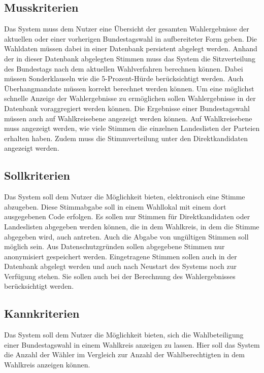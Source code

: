 \documentclass[a4paper]{scrreprt}
\begin{document}
\subsection{Musskriterien}

Das System muss dem Nutzer eine Übersicht der gesamten Wahlergebnisse der aktuellen oder einer vorherigen Bundestagswahl in aufbereiteter Form geben. Die Wahldaten müssen dabei in einer Datenbank persistent abgelegt werden. Anhand der in dieser Datenbank abgelegten Stimmen muss das System die Sitzverteilung des Bundestags nach dem aktuellen Wahlverfahren berechnen können. Dabei müssen Sonderklauseln wie die 5-Prozent-Hürde berücksichtigt werden. Auch Überhangmandate müssen korrekt berechnet werden können. Um eine möglichst schnelle Anzeige der Wahlergebnisse zu ermöglichen sollen Wahlergebnisse in der Datenbank voraggregiert werden können. Die Ergebnisse einer Bundestagswahl müssen auch auf Wahlkreisebene angezeigt werden können. Auf Wahlkreisebene muss angezeigt werden, wie viele Stimmen die einzelnen Landeslisten der Parteien erhalten haben. Zudem muss die Stimmverteilung unter den Direktkandidaten angezeigt werden. 

\subsection{Sollkriterien}

Das System soll dem Nutzer die Möglichkeit bieten, elektronisch eine Stimme abzugeben. Diese Stimmabgabe soll in einem Wahllokal mit einem dort ausgegebenen Code erfolgen. Es sollen nur Stimmen für Direktkandidaten oder Landeslisten abgegeben werden können, die in dem Wahlkreis, in dem die Stimme abgegeben wird, auch antreten. Auch die Abgabe von ungültigen Stimmen soll möglich sein. Aus Datenschutzgründen sollen abgegebene Stimmen nur anonymisiert gespeichert werden. Eingetragene Stimmen sollen auch in der Datenbank abgelegt werden und auch nach Neustart des Systems noch zur Verfügung stehen. Sie sollen auch bei der Berechnung des Wahlergebnisses berücksichtigt werden. 

\subsection{Kannkriterien}

Das System soll dem Nutzer die Möglichkeit bieten, sich die Wahlbeteiligung einer Bundestagswahl in einem Wahlkreis anzeigen zu lassen. Hier soll das System die Anzahl der Wähler im Vergleich zur Anzahl der Wahlberechtigten in dem Wahlkreis anzeigen können. 
 
\end{document}
